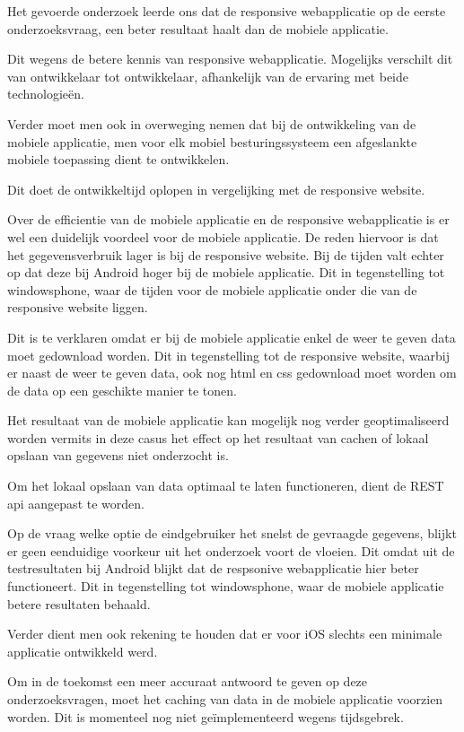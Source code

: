 Het gevoerde onderzoek leerde ons dat de responsive webapplicatie op de eerste onderzoeksvraag, een beter resultaat haalt dan de mobiele applicatie.

Dit wegens de betere kennis van responsive webapplicatie. Mogelijks verschilt dit van ontwikkelaar tot ontwikkelaar,
afhankelijk van de ervaring met beide technologieën.

Verder moet men ook in overweging nemen dat bij de ontwikkeling van de mobiele applicatie, men voor elk mobiel besturingssysteem een afgeslankte mobiele toepassing dient te ontwikkelen.

Dit doet de ontwikkeltijd oplopen in vergelijking met de responsive website.

Over de efficientie van de mobiele applicatie en de responsive webapplicatie is er wel een duidelijk voordeel voor de mobiele applicatie.
De reden hiervoor is dat het gegevensverbruik lager is bij de responsive website.
Bij de tijden valt echter op dat deze bij Android hoger bij de mobiele applicatie. Dit in tegenstelling tot windowsphone, waar de tijden voor de mobiele applicatie onder die van de responsive website liggen.

Dit is te verklaren omdat er bij de mobiele applicatie enkel de weer te geven data moet gedownload worden. Dit in tegenstelling tot de responsive website, waarbij er naast de weer te geven data, ook nog html
en css gedownload moet worden om de data op een geschikte manier te tonen.

Het resultaat van de mobiele applicatie kan mogelijk nog verder geoptimaliseerd worden vermits in deze casus het effect op het resultaat van cachen of lokaal opslaan van gegevens niet onderzocht is.

Om het lokaal opslaan van data optimaal te laten functioneren, dient de REST api aangepast te worden.

Op de vraag welke optie de eindgebruiker het snelst de gevraagde gegevens, blijkt er geen eenduidige voorkeur uit het onderzoek voort de vloeien.
Dit omdat uit de testresultaten bij Android blijkt dat de respsonive webapplicatie hier beter functioneert. Dit in tegenstelling tot windowsphone, waar de mobiele applicatie betere
resultaten behaald.

Verder dient men ook rekening te houden dat er voor iOS slechts een minimale applicatie ontwikkeld werd.

Om in de toekomst een meer accuraat antwoord te geven op deze onderzoeksvragen, moet het caching van data in de mobiele applicatie voorzien worden.
Dit is momenteel nog niet geïmplementeerd wegens tijdsgebrek.
